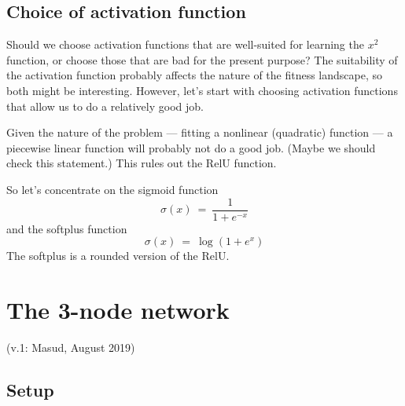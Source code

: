 \documentclass[12pt,a4paper]{article}
\begin{document}
\subsection{Choice of activation function}

Should we choose activation functions that are well-suited for learning  the $x^2$ function, or
choose those that are bad for the present purpose?  The suitability of the activation function
probably affects the nature of the fitness landscape, so both might be interesting.  However, let's
start with choosing activation functions that allow us to do a relatively good job.  

Given the nature of the problem --- fitting a nonlinear (quadratic) function --- a piecewise linear
function will probably not do a good job.  (Maybe we should check this statement.)  This rules out
the RelU function.

So let's concentrate on the sigmoid function
\[
\sigma(x) ~=~ \frac{1}{1+e^{-x}}
\]
and the softplus function
\[
\sigma(x) ~=~ \log(1 + e^x)
\]
The softplus is a rounded version of the RelU.  



\newpage 


\section{The 3-node network}

(v.1: Masud, August 2019)

\subsection{Setup}
\end{document}
